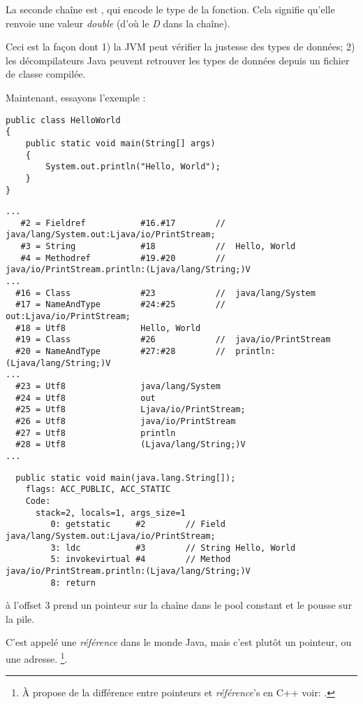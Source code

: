 La seconde chaîne est , qui encode le type de la fonction.
Cela signifie qu'elle renvoie une valeur \emph{double} (d'où le \emph{D} dans la chaîne).

Ceci est la façon dont
1) la JVM peut vérifier la justesse des types de données;
2) les décompilateurs Java peuvent retrouver les types de données depuis un fichier
de classe compilée.


Maintenant, essayons l'exemple :


\begin{lstlisting}[style=customjava]
public class HelloWorld
{
	public static void main(String[] args)
	{
		System.out.println("Hello, World");
	}
}
\end{lstlisting}

\begin{lstlisting}[caption=Constant pool]
...
   #2 = Fieldref           #16.#17        //  java/lang/System.out:Ljava/io/PrintStream;
   #3 = String             #18            //  Hello, World
   #4 = Methodref          #19.#20        //  java/io/PrintStream.println:(Ljava/lang/String;)V
...
  #16 = Class              #23            //  java/lang/System
  #17 = NameAndType        #24:#25        //  out:Ljava/io/PrintStream;
  #18 = Utf8               Hello, World
  #19 = Class              #26            //  java/io/PrintStream
  #20 = NameAndType        #27:#28        //  println:(Ljava/lang/String;)V
...
  #23 = Utf8               java/lang/System
  #24 = Utf8               out
  #25 = Utf8               Ljava/io/PrintStream;
  #26 = Utf8               java/io/PrintStream
  #27 = Utf8               println
  #28 = Utf8               (Ljava/lang/String;)V
...
\end{lstlisting}

\begin{lstlisting}
  public static void main(java.lang.String[]);
    flags: ACC_PUBLIC, ACC_STATIC
    Code:
      stack=2, locals=1, args_size=1
         0: getstatic     #2        // Field java/lang/System.out:Ljava/io/PrintStream;
         3: ldc           #3        // String Hello, World
         5: invokevirtual #4        // Method java/io/PrintStream.println:(Ljava/lang/String;)V
         8: return
\end{lstlisting}

 à l'offset 3 prend un pointeur sur la chaîne  dans le pool
constant et le pousse sur la pile.

C'est appelé une \emph{référence} dans le monde Java, mais c'est plutôt un pointeur,
ou une adresse.
\footnote{À propose de la différence entre pointeurs et \emph{référence}'s en C++ voir: .}.


